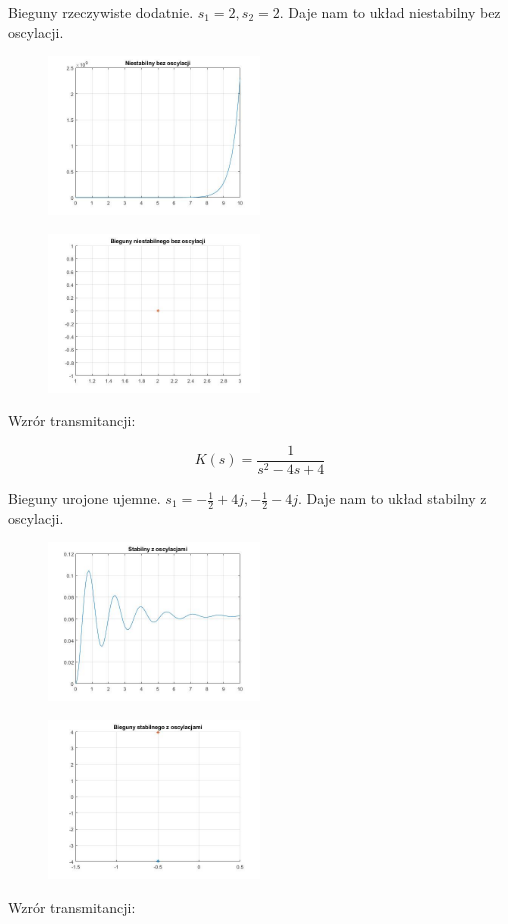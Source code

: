 \documentclass{article}
\begin{document}
Bieguny rzeczywiste dodatnie. $s_1 = 2,s_2 = 2$. Daje nam to układ niestabilny bez oscylacji.

\begin{figure}
    \centering
    \includegraphics[width=0.5\textwidth]{niestab.jpg}
\end{figure}
\begin{figure}
    \centering
    \includegraphics[width=0.5\textwidth]{biegniestab.jpg}
\end{figure}
Wzrór transmitancji:

$$ K(s) =\frac{1}{s^2-4s+4} $$

Bieguny urojone ujemne. $s_1 = -\frac{1}{2}+4j , -\frac{1}{2}-4j$. Daje nam to układ stabilny z oscylacji.

\begin{figure}
    \centering
    \includegraphics[width=0.5\textwidth]{stabosc.jpg}
\end{figure}
\begin{figure}
    \centering
    \includegraphics[width=0.5\textwidth]{biegoscstab.jpg}
\end{figure}
Wzrór transmitancji:
\end{document}

